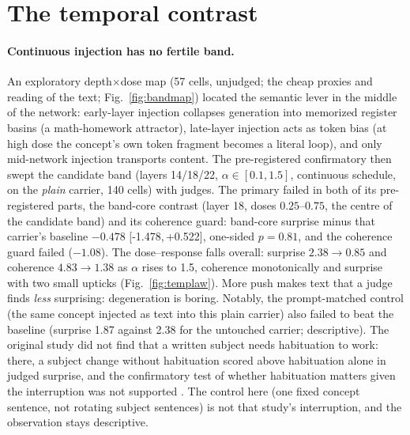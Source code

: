 \documentclass[11pt]{article}
\newcommand{\ci}[2]{[#1,\,#2]}
\begin{document}
\section{The temporal contrast}
\label{sec:temporal}

\paragraph{Continuous injection has no fertile band.} An exploratory
depth$\times$dose map (57 cells, unjudged; the cheap proxies and
reading of the text; Fig.~\ref{fig:bandmap}) located the semantic
lever in the middle of the network: early-layer injection collapses generation into memorized
register basins (a math-homework attractor), late-layer injection acts
as token bias (at high dose the concept's own token fragment becomes
a literal loop), and only mid-network injection transports content.
The pre-registered confirmatory then swept the candidate band (layers
14/18/22, $\alpha\in[0.1,1.5]$, continuous schedule, on the
\emph{plain} carrier, 140 cells) with judges. The primary failed in
both of its pre-registered parts, the band-core contrast (layer 18,
doses $0.25$--$0.75$, the centre of the candidate band) and its
coherence guard: band-core surprise minus that carrier's baseline $-0.478$
\ci{-1.478}{+0.522}, one-sided $p=0.81$, and the coherence guard
failed ($-1.08$). The dose--response falls overall: surprise
$2.38 \to 0.85$ and coherence $4.83 \to 1.38$ as $\alpha$ rises to
1.5, coherence monotonically and surprise with two small upticks
(Fig.~\ref{fig:templaw}). More push makes text that a
judge finds \emph{less} surprising: degeneration is boring. Notably,
the prompt-matched control (the same concept injected as text into
this plain carrier) also failed to beat the baseline (surprise 1.87
against 2.38 for the untouched carrier; descriptive). The original study
did not find that a written subject needs habituation to work: there, a
subject change without habituation scored above habituation alone in
judged surprise, and the confirmatory test of whether habituation
matters given the interruption was not supported
\citep{ono2026interrupting}. The control here (one fixed concept
sentence, not rotating subject sentences) is not that study's
interruption, and the observation stays descriptive.
\end{document}
